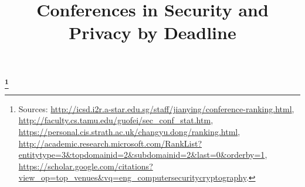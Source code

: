 \documentclass[a3paper]{article}
\title{Conferences in Security and Privacy by Deadline}
\begin{document}
\pagestyle{empty}
\begin{center}
  \LARGE\bfseries\thetitle\footnote{%
    Sources: 
    \url{http://icsd.i2r.a-star.edu.sg/staff/jianying/conference-ranking.html},
    \url{http://faculty.cs.tamu.edu/guofei/sec_conf_stat.htm},
    \url{https://personal.cis.strath.ac.uk/changyu.dong/ranking.html},
    \url{http://academic.research.microsoft.com/RankList?entitytype=3&topdomainid=2&subdomainid=2&last=0&orderby=1},
    \url{https://scholar.google.com/citations?view_op=top_venues&vq=eng_computersecuritycryptography}.
}
\end{center}
\DeclareDocumentCommand{\tierone}{}{\color{red}}
\DeclareDocumentCommand{\tiertwo}{}{\color{orange}}
\DeclareDocumentCommand{\tierthree}{}{\color{DarkGreen}}
\DeclareDocumentCommand{\tierfour}{}{\color{blue}}
\DeclareDocumentCommand{\tierfive}{}{\color{purple}}
\end{document}
